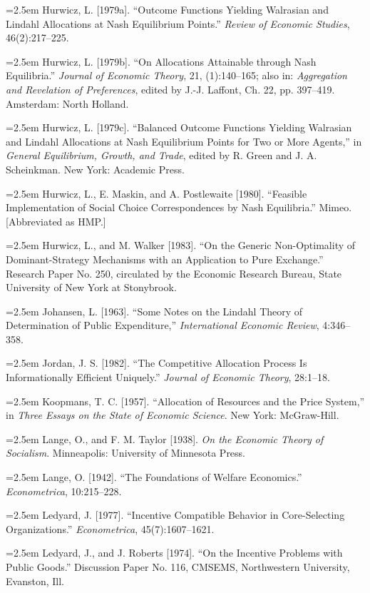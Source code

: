 \documentclass[12pt, letterpaper]{article}
\newcommand{\bibentry}[1]{\noindent\hangindent=2.5em\hangafter=1 \small #1 \par\vspace{0.7em}}
\begin{document}
\bibentry{Hurwicz, L. [1979a]. ``Outcome Functions Yielding Walrasian and Lindahl Allocations at Nash Equilibrium Points.'' \textit{Review of Economic Studies}, 46(2):217--225.}

\bibentry{Hurwicz, L. [1979b]. ``On Allocations Attainable through Nash Equilibria.'' \textit{Journal of Economic Theory}, 21, (1):140--165; also in: \textit{Aggregation and Revelation of Preferences}, edited by J.-J. Laffont, Ch. 22, pp. 397--419. Amsterdam: North Holland.}

\bibentry{Hurwicz, L. [1979c]. ``Balanced Outcome Functions Yielding Walrasian and Lindahl Allocations at Nash Equilibrium Points for Two or More Agents,'' in \textit{General Equilibrium, Growth, and Trade}, edited by R. Green and J. A. Scheinkman. New York: Academic Press.}

\bibentry{Hurwicz, L., E. Maskin, and A. Postlewaite [1980]. ``Feasible Implementation of Social Choice Correspondences by Nash Equilibria.'' Mimeo. [Abbreviated as HMP.]}

\bibentry{Hurwicz, L., and M. Walker [1983]. ``On the Generic Non-Optimality of Dominant-Strategy Mechanisms with an Application to Pure Exchange.'' Research Paper No. 250, circulated by the Economic Research Bureau, State University of New York at Stonybrook.}

\bibentry{Johansen, L. [1963]. ``Some Notes on the Lindahl Theory of Determination of Public Expenditure,'' \textit{International Economic Review}, 4:346--358.}

\bibentry{Jordan, J. S. [1982]. ``The Competitive Allocation Process Is Informationally Efficient Uniquely.'' \textit{Journal of Economic Theory}, 28:1--18.}

\bibentry{Koopmans, T. C. [1957]. ``Allocation of Resources and the Price System,'' in \textit{Three Essays on the State of Economic Science}. New York: McGraw-Hill.}

\bibentry{Lange, O., and F. M. Taylor [1938]. \textit{On the Economic Theory of Socialism}. Minneapolis: University of Minnesota Press.}

\bibentry{Lange, O. [1942]. ``The Foundations of Welfare Economics.'' \textit{Econometrica}, 10:215--228.}

\bibentry{Ledyard, J. [1977]. ``Incentive Compatible Behavior in Core-Selecting Organizations.'' \textit{Econometrica}, 45(7):1607--1621.}

\bibentry{Ledyard, J., and J. Roberts [1974]. ``On the Incentive Problems with Public Goods.'' Discussion Paper No. 116, CMSEMS, Northwestern University, Evanston, Ill.}
\end{document}
